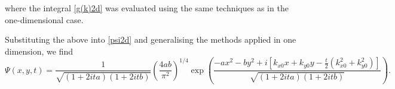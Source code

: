 \documentclass[11pt]{article}
\begin{document}
where the integral \eqref{g(k)2d} was evaluated using the same techniques as in the one-dimensional case. \par 
Substituting the above into \eqref{psi2d} and generalising the methods applied in one dimension, we find 
\begin{equation*}
\boxed{\Psi (x,y,t) = \frac{1}{\sqrt{(1+ 2ita)(1+2itb)}} \left( \frac{4ab}{\pi^2} \right)^{1/4} \exp \left( \frac{-ax^2-by^2 +i\left[k_{x0}x+k_{y0}y- \frac{t}{2}(k_{x0}^2+k_{y0}^2) \right]}{\sqrt{(1+ 2ita)(1+2itb)}} \right)}.
\end{equation*}
\end{document}
